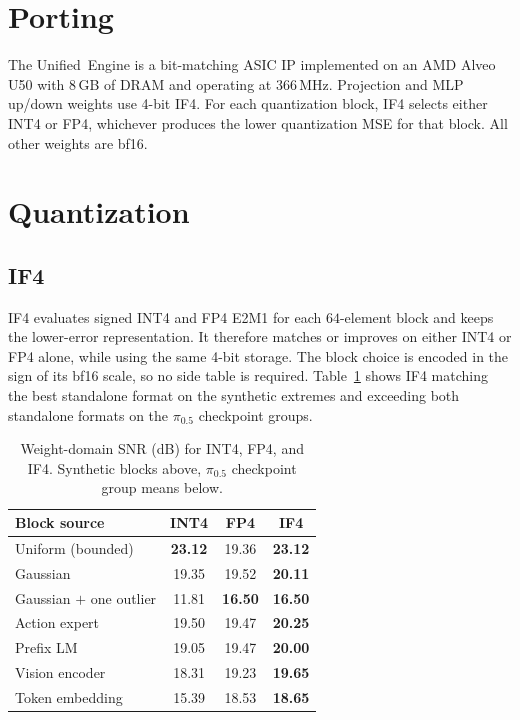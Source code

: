 \documentclass[11pt]{article}
\newcommand{\pizero}{$\pi_{0.5}$}
\newcommand{\ue}{Unified~Engine}
\newcommand{\iffour}{IF4}
\newcommand{\bfteen}{bf16}
\begin{document}
\section{Porting}
\label{sec:port}
The \ue{} is a bit-matching ASIC IP implemented on an AMD Alveo U50 with
$8$\,GB of DRAM and operating at $366$\,MHz. Projection and MLP up/down weights
use 4-bit \iffour{}. For each quantization block, \iffour{} selects either INT4
or FP4, whichever produces the lower quantization MSE for that block. All other
weights are \bfteen{}.

\section{Quantization}
\label{sec:quant}
\subsection{\iffour{}}
\iffour{} evaluates signed INT4 and FP4 E2M1 for each $64$-element block and
keeps the lower-error representation. It therefore matches or improves on
either INT4 or FP4 alone, while using the same 4-bit storage. The block choice
is encoded in the sign of its \bfteen{} scale, so no side table is required.
Table~\ref{tab:if4} shows \iffour{} matching the best standalone format on the
synthetic extremes and exceeding both standalone formats on the \pizero{}
checkpoint groups.

\begin{table}[H]
\centering\small
\caption{Weight-domain SNR (dB) for INT4, FP4, and \iffour{}. Synthetic blocks
above, \pizero{} checkpoint group means below.}
\label{tab:if4}
\begin{tabular}{@{}lccc@{}}
\toprule
\textbf{Block source} & \textbf{INT4} & \textbf{FP4} & \textbf{\iffour{}} \\
\midrule
Uniform (bounded)          & \textbf{23.12} & 19.36 & \textbf{23.12} \\
Gaussian                   & 19.35 & 19.52 & \textbf{20.11} \\
Gaussian $+$ one outlier   & 11.81 & \textbf{16.50} & \textbf{16.50} \\
\midrule
Action expert   & 19.50 & 19.47 & \textbf{20.25} \\
Prefix LM       & 19.05 & 19.47 & \textbf{20.00} \\
Vision encoder  & 18.31 & 19.23 & \textbf{19.65} \\
Token embedding & 15.39 & 18.53 & \textbf{18.65} \\
\bottomrule
\end{tabular}
\end{table}
\end{document}
